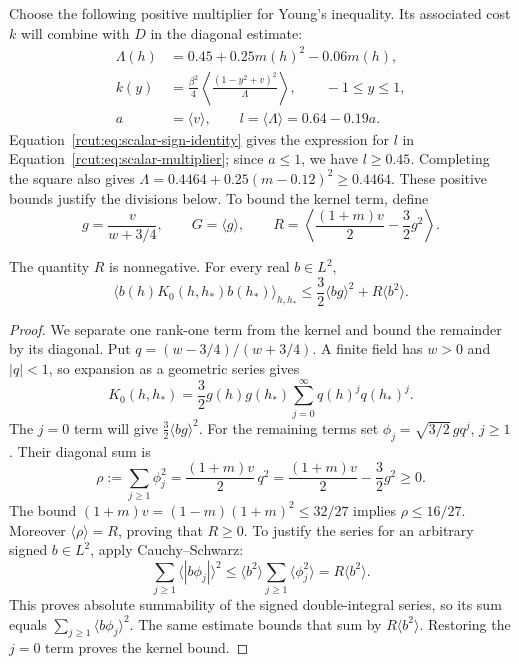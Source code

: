 Choose the following positive multiplier for Young's inequality.
Its associated cost \(k\) will combine with \(D\) in the diagonal estimate:
\begin{equation}
 \begin{split}
 \Lambda{}(h)&=0.45+0.25m(h)^2-0.06m(h),\\
 k(y)&=\frac{\beta^2}{4}
       \left\langle\frac{(1-y^2+v)^2}{\Lambda{}}\right\rangle,
       \qquad -1\leq y\leq1,\\
 a&=\langle v\rangle,
 \qquad l=\langle \Lambda{}\rangle=0.64-0.19a.
 \end{split}
 \label{rcut:eq:scalar-multiplier}
\end{equation}
Equation~\eqref{rcut:eq:scalar-sign-identity} gives the expression for
\(l\) in Equation~\eqref{rcut:eq:scalar-multiplier}; since \(a\leq1\),
we have \(l\geq0.45\). Completing the square also gives
\(\Lambda{}=0.4464+0.25(m-0.12)^2\geq0.4464\).
These positive bounds justify the divisions below. To bound the
kernel term, define
\[
 g=\frac{v}{w+3/4},\qquad G=\langle g\rangle,
 \qquad
 R=\left\langle\frac{(1+m)v}{2}-\frac32 g^2\right\rangle.
\]

\begin{lemma}
\label{rcut:lem:scalar-kernel}
The quantity \(R\) is nonnegative. For every real \(b\in L^2\),
\begin{equation}
 \langle b(h)K_0(h,h_*)b(h_*)\rangle_{h,h_*}
 \leq \frac32\langle bg\rangle^2+R\langle b^2\rangle.
 \label{rcut:eq:scalar-kernel-bound}
\end{equation}
\end{lemma}

\begin{proof}
We separate one rank-one term from the kernel and bound the remainder
by its diagonal. Put \(q=(w-3/4)/(w+3/4)\). A finite field has
\(w>0\) and \(|q|<1\), so expansion as a geometric series gives
\[
 K_0(h,h_*)=\frac32 g(h)g(h_*)\sum_{j=0}^{\infty}q(h)^j q(h_*)^j.
\]
The \(j=0\) term will give \(\frac32\langle bg\rangle^2\).
For the remaining terms set \(\phi_j=\sqrt{3/2}\,gq^j\), \(j\geq1\).
Their diagonal sum is
\begin{equation}
 \rho:=\sum_{j\geq1}\phi_j^2
 =\frac{(1+m)v}{2}\,q^2
 =\frac{(1+m)v}{2}-\frac32g^2\geq0.
 \label{rcut:eq:scalar-residual-diagonal}
\end{equation}
The bound \((1+m)v=(1-m)(1+m)^2\leq32/27\) implies
\(\rho\leq16/27\). Moreover \(\langle\rho\rangle=R\), proving that
\(R\geq0\). To justify the series for an arbitrary signed
\(b\in L^2\), apply Cauchy--Schwarz:
\[
 \sum_{j\geq1}\langle|b\phi_j|\rangle^2
 \leq\langle b^2\rangle\sum_{j\geq1}\langle\phi_j^2\rangle
 =R\langle b^2\rangle.
\]
This proves absolute summability of the signed double-integral series,
so its sum equals \(\sum_{j\geq1}\langle b\phi_j\rangle^2\).
The same estimate bounds that sum by \(R\langle b^2\rangle\).
Restoring the \(j=0\) term proves the kernel bound.
\end{proof}

